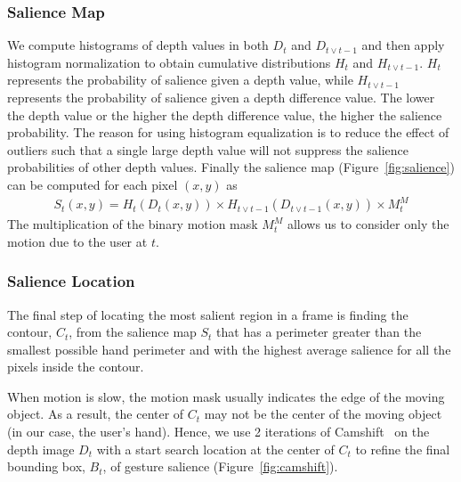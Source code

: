 \documentclass{acm_proc_article-sp}
\begin{document}
\subsubsection{Salience Map}
We compute histograms of depth values in both $D_t$ and $D_{t\vee t-1}$ and then apply histogram normalization to obtain cumulative distributions $H_t$ and $H_{t\vee t-1}$.
$H_t$ represents the probability of salience given a depth value, while $H_{t\vee t-1}$ represents the probability of salience given
a depth difference value. The lower the depth value or the higher the depth difference value, the higher the salience probability. The reason for using
histogram equalization is to reduce the effect of outliers such that a single large depth value will not suppress the salience probabilities of other depth values. 
Finally the salience map (Figure~\ref{fig:salience}) can be computed for each pixel $(x, y)$ as
\begin{align*}
S_t(x, y) = H_t(D_t(x, y)) \times H_{t\vee t-1}(D_{t\vee t-1}(x, y)) \times M_t^M
\end{align*}
The multiplication of the binary motion mask $M_t^M$ allows us to consider only the motion due to the user at $t$.
 
\subsubsection{Salience Location}
The final step of locating the most salient region in a frame is finding the
contour, $C_t$, from the salience map $S_t$ that has a perimeter greater than
the smallest possible hand perimeter and with the highest average salience for all the pixels inside the contour.

When motion is slow, the motion mask usually indicates the edge of the moving
object. As a result, the center of $C_t$ may not be the center of the moving
object (in our case, the user's hand). Hence, we use 2 iterations of Camshift~\cite{Bradski98} on the depth image $D_t$ with a start search location at the center of $C_t$ to refine
the final bounding box, $B_t$, of gesture salience (Figure~\ref{fig:camshift}).
\end{document}

